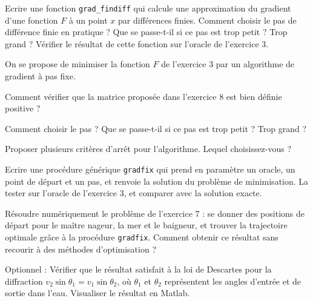 \documentclass[12pt,a4paper,fleqn]{report}
\begin{document}
\begin{exercice}
  Ecrire une fonction \verb+grad_findiff+ qui calcule une
  approximation du gradient d'une fonction $F$ à un point $x$ par
  différences finies. Comment choisir le pas de différence finie en
  pratique ? Que se passe-t-il si ce pas est trop petit ? Trop grand ?
  Vérifier le résultat de cette fonction sur l'oracle de l'exercice 3.
\end{exercice}

\begin{exercice}
  On se propose de minimiser la fonction $F$ de l'exercice 3 par un
  algorithme de gradient à pas fixe.
  \begin{questions}
  \item Comment vérifier que la matrice proposée dans l'exercice 8 est
    bien définie positive ?
  \item Comment choisir le pas ? Que se passe-t-il si ce pas est trop
    petit ? Trop grand ?
  \item Proposer plusieurs critères d'arrêt pour l'algorithme. Lequel
    choisissez-vous ?
  \item Ecrire une procédure générique \verb+gradfix+ qui prend en
    paramètre un oracle, un point de départ et un pas, et renvoie la
    solution du problème de minimisation. La tester sur l'oracle de
    l'exercice 3, et comparer avec la solution exacte.
  \end{questions}

\end{exercice}

\begin{exercice}
  Résoudre numériquement le problème de l'exercice 7 : se donner des
  positions de départ pour le maître nageur, la mer et le baigneur, et
  trouver la trajectoire optimale grâce à la procédure
  \verb+gradfix+. Comment obtenir ce résultat sans recourir à des
  méthodes d'optimisation ?

  Optionnel : Vérifier que le résultat satisfait à la loi de Descartes
  pour la diffraction $v_{2} \sin \theta_{1} = v_{1} \sin \theta_{2}$,
  où $\theta_{1}$ et $\theta_{2}$ représentent les angles d'entrée et
  de sortie dans l'eau. Visualiser le résultat en Matlab.
\end{exercice}
\end{document}
